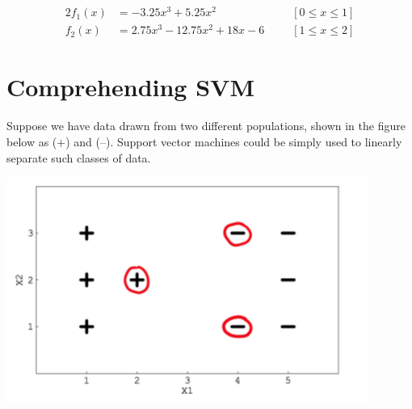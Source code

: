 \documentclass[11pt]{article}
\begin{document}
\begin{enumerate}
\begin{minipage}[t]{0.42\linewidth}
\begin{center}
                \end{center}
                {\footnotesize
                    \begin{alignat*}{2}
                        f_1(x) &= -3.25x^3 + 5.25x^2 \;\;\; &&\left[ 0 \leq x \leq 1 \right] \\
                        f_2(x) &= 2.75x^3 - 12.75x^2 + 18x -6 \;\;\; &&\left[ 1 \leq x \leq 2 \right]
                    \end{alignat*}
                } 
            \end{minipage} 
    \end{enumerate}

    \section{Comprehending SVM}
    Suppose we have data drawn from two different populations, shown in the 
    figure below as (+) and (--). Support vector machines could be simply used 
    to linearly separate such classes of data.
    \begin{center}
        \includegraphics[width=0.6\linewidth]{og.png}
    \end{center}
\end{document}
